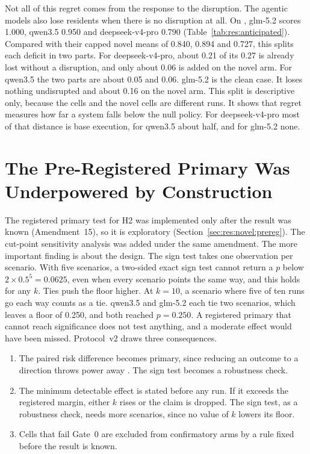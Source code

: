 Not all of this regret comes from the response to the disruption. The agentic
models also lose residents when there is no disruption at all. On
, glm-5.2 scores 1.000, qwen3.5 0.950 and deepseek-v4-pro
0.790 (Table~\ref{tab:res:anticipated}). Compared with their capped novel
means of 0.840, 0.894 and 0.727, this splits each deficit in two parts. For
deepseek-v4-pro, about 0.21 of its 0.27 is already lost without a disruption,
and only about 0.06 is added on the novel arm. For qwen3.5 the two parts are
about 0.05 and 0.06. glm-5.2 is the clean case. It loses nothing undisrupted
and about 0.16 on the novel arm. This split is descriptive only, because the
 cells and the novel cells are different runs. It shows
that regret measures how far a system falls below the null policy. For
deepseek-v4-pro most of that distance is base execution, for qwen3.5 about
half, and for glm-5.2 none.

\section{The Pre-Registered Primary Was Underpowered by Construction}
\label{sec:crit:power}

The registered primary test for H2 was implemented only after the result was
known (Amendment~15), so it is exploratory
(Section~\ref{sec:res:novel:prereg}). The cut-point sensitivity analysis
\parencite{simonsohn2020} was added under the same amendment. The more
important finding is about the design. The sign test takes one observation
per scenario. With five scenarios, a two-sided exact sign test cannot return a
$p$ below $2 \times 0.5^5 = 0.0625$, even when every scenario points the same
way, and this holds for any $k$. Ties push the floor higher. At $k = 10$, a
scenario where five of ten runs go each way counts as a tie. qwen3.5 and
glm-5.2 each tie two scenarios, which leaves a floor of 0.250, and both reached
$p = 0.250$. A registered primary that cannot reach significance does not test
anything, and a moderate effect would have been missed. Protocol~v2 draws
three consequences.

\begin{enumerate}
\item The paired risk difference becomes primary, since reducing an outcome to
  a direction throws power away
  \parencite{optimisinganalysisofstroketrialsoastcollaboration2007a}. The sign test becomes a
  robustness check.
\item The minimum detectable effect \parencite{cohen1988} is stated before any
  run. If it exceeds the registered margin, either $k$ rises or the claim is
  dropped. The sign test, as a robustness check, needs more scenarios, since
  no value of $k$ lowers its floor.
\item Cells that fail Gate~0 are excluded from confirmatory arms by a rule
  fixed before the result is known.
\end{enumerate}

